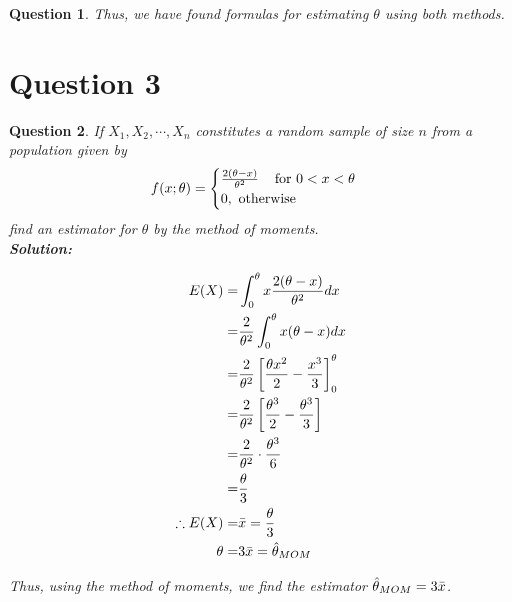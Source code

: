\documentclass{article}
\theoremstyle{questionstyle}
\newtheorem{myquestion}{Question}
\begin{document}
\begin{myquestion}
Thus, we have found formulas for estimating \(\theta\) using both methods.

\end{myquestion} %

\section{Question 3}
\begin{myquestion}
   If \(X_1, X_2, \cdots, X_n\) constitutes a random sample of size \(n\) from a population given by
   \[ f(x;\theta) = 
   \begin{cases}
   \frac{2(\theta-x)}{\theta^2} \hspace{.4cm} \text{for } 0 < x < \theta\\ 
   0, \text{ otherwise}
   \end{cases}
   \]
   find an estimator for \(\theta\) by the method of moments.\\

\textbf{Solution:}

\begin{align*}
    E(X) =& \int_0^{\theta} x \frac{2(\theta-x)}{\theta^2}dx\\
    =& \frac{2}{\theta^2} \int_0^{\theta} x(\theta-x)dx\\
    =& \frac{2}{\theta^2} \left[ \frac{\theta x^2}{2} - \frac{x^3}{3}\right]_{0}^{\theta}\\
    =& \frac{2}{\theta^2} \left[ \frac{\theta^3}{2} - \frac{\theta^3}{3}\right]\\
    =& \frac{2}{\theta^2} \cdot \frac{\theta^3}{6}\\
    =& \frac{\theta}{3}\\
    \therefore E(X) =& \Bar{x} = \frac{\theta}{3}\\
    \theta =& 3\Bar{x} = \hat{\theta}_{MOM}\\
\end{align*}

Thus, using the method of moments, we find the estimator \(\hat{\theta}_{MOM} = 3\Bar{x}\).

\end{myquestion} %
\end{document}
